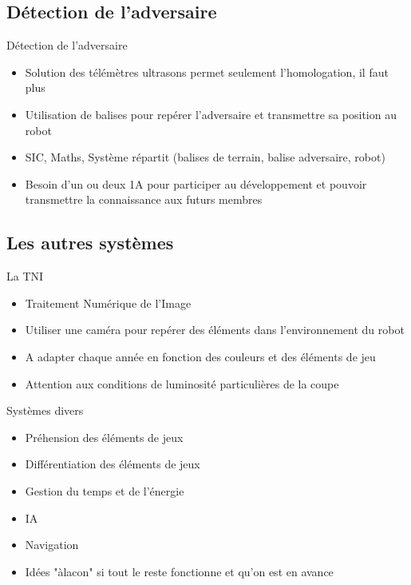 \documentclass{beamer}
\begin{document}
\subsection{Détection de l'adversaire}
\begin{frame}{Détection de l'adversaire}
	\begin{itemize}
		\item Solution des télémètres ultrasons permet seulement l'homologation, il faut plus
		\item Utilisation de balises pour repérer l'adversaire et transmettre sa position au robot
		\item SIC, Maths, Système répartit (balises de terrain, balise adversaire, robot)
		\item Besoin d'un ou deux 1A pour participer au développement et pouvoir transmettre la connaissance aux futurs membres
	\end{itemize}
\end{frame}

\subsection{Les autres systèmes}
\begin{frame}{La TNI}
	\begin{itemize}
		\item Traitement Numérique de l'Image
		\item Utiliser une caméra pour repérer des éléments dans l'environnement du robot
		\item A adapter chaque année en fonction des couleurs et des éléments de jeu
		\item Attention aux conditions de luminosité particulières de la coupe
	\end{itemize}
\end{frame}

\begin{frame}{Systèmes divers}
	\begin{itemize}
		\item Préhension des éléments de jeux
		\item Différentiation des éléments de jeux
		\item Gestion du temps et de l'énergie
		\item IA
		\item Navigation
		\item Idées "àlacon" si tout le reste fonctionne et qu'on est en avance
	\end{itemize}
\end{frame}
\end{document}
